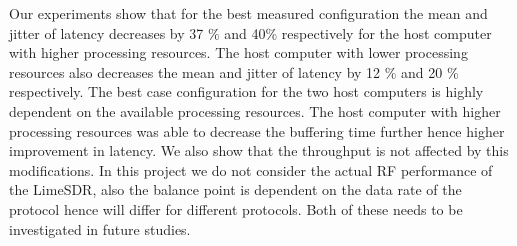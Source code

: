 Our experiments show that for the best measured configuration the mean and jitter of latency decreases by 37 \% and 40\% respectively for the host computer with higher processing resources.
The host computer with lower processing resources also decreases the mean and jitter of latency by 12 \% and 20 \% respectively.
The best case configuration for the two host computers is highly dependent on the available processing resources.
The host computer with higher processing resources was able to decrease the buffering time further hence higher improvement in latency.
We also show that the throughput is not affected by this modifications.
In this project we do not consider the actual RF performance of the LimeSDR, also the balance point is dependent on the data rate of the protocol hence will differ for different protocols.
Both of these needs to be investigated in future studies. \\
